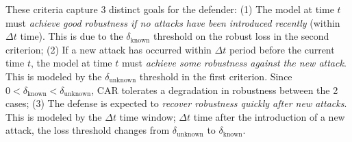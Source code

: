 These criteria capture 3 distinct goals for the defender:  (1) The model at time $t$ must \textit{achieve good robustness if no attacks have been introduced recently} (within $\Delta t$ time). This is due to the $\delta_{\text{known}}$ threshold on the robust loss in the second criterion;  (2) If a new attack has occurred within $\Delta t$ period before the current time $t$, the model at time $t$ must \textit{achieve some robustness against the new attack}.  This is modeled by the $\delta_{\text{unknown}}$ threshold in the first criterion.  Since $0 < \delta_{\text{known}} < \delta_{\text{unknown}}$, CAR tolerates a degradation in robustness between the 2 cases; (3) The defense is expected to \textit{recover robustness quickly after new attacks}.  This is modeled by the $\Delta t$ time window; $\Delta t$ time after the introduction of a new attack, the loss threshold changes from $\delta_{\text{unknown}}$ to $\delta_{\text{known}}$.


